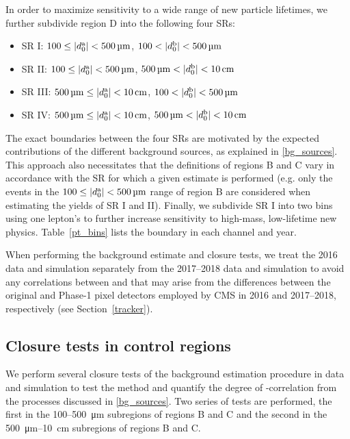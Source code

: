 In order to maximize sensitivity to a wide range of new particle lifetimes, we further subdivide region D into the following four SRs:
\begin{itemize}
    \itemsep0em
    \item SR I:   $\num{100}\leq\ada<\SI{500}{\um}$, $\num{100} < \adb<\SI{500}{\um}$
    \item SR II:  $\num{100}\leq\ada<\SI{500}{\um}$, $\SI{500}{\um}<\adb<\SI{10}{\cm}$
    \item SR III: $\SI{500}{\um} \leq \ada<\SI{10}{\cm}$, $\num{100} < \adb<\SI{500}{\um}$
    \item SR IV:  $\SI{500}{\um} \leq \ada<\SI{10}{\cm}$, $\SI{500}{\um}<\adb<\SI{10}{\cm}$
\end{itemize}
The exact boundaries between the four SRs are motivated by the expected contributions of the different background sources, as explained in \ref{bg_sources}. This approach also necessitates that the definitions of regions B and C vary in accordance with the SR for which a given estimate is performed (e.g. only the events in the $\num{100}\leq\ada<\SI{500}{\um}$ range of region B are considered when estimating the yields of SR I and II). Finally, we subdivide SR I into two bins using one lepton's \pt to further increase sensitivity to high-mass, low-lifetime new physics. Table~\ref{pt_bins} lists the \pt boundary in each channel and year.



When performing the background estimate and closure tests, we treat the 2016 data and simulation separately from the 2017--2018 data and simulation to avoid any correlations between \ada and \adb that may arise from the differences between the original and Phase-1 pixel detectors employed by CMS in 2016 and 2017--2018, respectively (see Section~\ref{tracker}).

\subsection{Closure tests in control regions}
\label{cr_closure_tests}
We perform several closure tests of the background estimation procedure in data and simulation to test the method and quantify the degree of \ada-\adb correlation from the processes discussed in \ref{bg_sources}. Two series of tests are performed, the first in the \num{100}--\SI{500}{\um} subregions of regions B and C and the second in the \SI{500}{\um}--\SI{10}{\cm} subregions of regions B and C.

